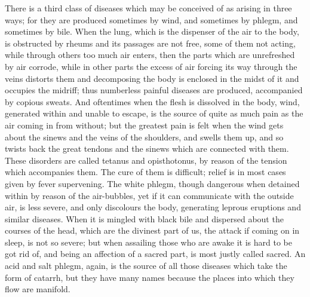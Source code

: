 \documentclass[11pt,letter]{article}
\begin{document}
\par  There is a third class of diseases which may be conceived of as arising in three ways; for they are produced sometimes by wind, and sometimes by phlegm, and sometimes by bile. When the lung, which is the dispenser of the air to the body, is obstructed by rheums and its passages are not free, some of them not acting, while through others too much air enters, then the parts which are unrefreshed by air corrode, while in other parts the excess of air forcing its way through the veins distorts them and decomposing the body is enclosed in the midst of it and occupies the midriff; thus numberless painful diseases are produced, accompanied by copious sweats. And oftentimes when the flesh is dissolved in the body, wind, generated within and unable to escape, is the source of quite as much pain as the air coming in from without; but the greatest pain is felt when the wind gets about the sinews and the veins of the shoulders, and swells them up, and so twists back the great tendons and the sinews which are connected with them. These disorders are called tetanus and opisthotonus, by reason of the tension which accompanies them. The cure of them is difficult; relief is in most cases given by fever supervening. The white phlegm, though dangerous when detained within by reason of the air-bubbles, yet if it can communicate with the outside air, is less severe, and only discolours the body, generating leprous eruptions and similar diseases. When it is mingled with black bile and dispersed about the courses of the head, which are the divinest part of us, the attack if coming on in sleep, is not so severe; but when assailing those who are awake it is hard to be got rid of, and being an affection of a sacred part, is most justly called sacred. An acid and salt phlegm, again, is the source of all those diseases which take the form of catarrh, but they have many names because the places into which they flow are manifold.
\end{document}

